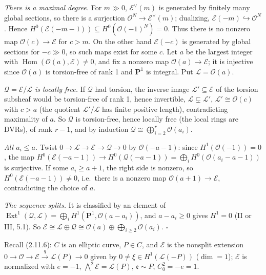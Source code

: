 \documentclass[11pt]{article}
\begin{document}
\emph{There is a maximal degree.} For $m\gg0$, $\mathcal E^\vee(m)$ is generated by finitely many global sections, so there is a surjection $\mathcal O^N\to\mathcal E^\vee(m)$; dualizing, $\mathcal E(-m)\hookrightarrow\mathcal O^N$. Hence $H^0(\mathcal E(-m-1))\subseteq H^0(\mathcal O(-1)^N)=0$. Thus there is no nonzero map $\mathcal O(c)\to\mathcal E$ for $c>m$. On the other hand $\mathcal E(-c)$ is generated by global sections for $-c\gg0$, so such maps exist for some $c$. Let $a$ be the largest integer with $\operatorname{Hom}(\mathcal O(a),\mathcal E)\ne0$, and fix a nonzero map $\mathcal O(a)\to\mathcal E$; it is injective since $\mathcal O(a)$ is torsion-free of rank 1 and $\mathbf P^1$ is integral. Put $\mathcal L=\mathcal O(a)$.

\emph{$\mathcal Q=\mathcal E/\mathcal L$ is locally free.} If $\mathcal Q$ had torsion, the inverse image $\mathcal L'\subseteq\mathcal E$ of the torsion subsheaf would be torsion-free of rank 1, hence invertible, $\mathcal L\subsetneq\mathcal L'$, $\mathcal L'\cong\mathcal O(c)$ with $c>a$ (the quotient $\mathcal L'/\mathcal L$ has finite positive length), contradicting maximality of $a$. So $\mathcal Q$ is torsion-free, hence locally free (the local rings are DVRs), of rank $r-1$, and by induction $\mathcal Q\cong\bigoplus_{i=2}^r\mathcal O(a_i)$.

\emph{All $a_i\le a$.} Twist $0\to\mathcal L\to\mathcal E\to\mathcal Q\to0$ by $\mathcal O(-a-1)$: since $H^1(\mathcal O(-1))=0$, the map $H^0(\mathcal E(-a-1))\to H^0(\mathcal Q(-a-1))=\bigoplus_iH^0(\mathcal O(a_i-a-1))$ is surjective. If some $a_i\ge a+1$, the right side is nonzero, so $H^0(\mathcal E(-a-1))\ne0$, i.e.\ there is a nonzero map $\mathcal O(a+1)\to\mathcal E$, contradicting the choice of $a$.

\emph{The sequence splits.} It is classified by an element of $\operatorname{Ext}^1(\mathcal Q,\mathcal L)=\bigoplus_iH^1(\mathbf P^1,\mathcal O(a-a_i))$, and $a-a_i\ge0$ gives $H^1=0$ (II or III, 5.1). So $\mathcal E\cong\mathcal L\oplus\mathcal Q\cong\mathcal O(a)\oplus\bigoplus_{i\ge2}\mathcal O(a_i)$. \hfill$\square$

\pf
Recall (2.11.6): $C$ is an elliptic curve, $P\in C$, and $\mathcal E$ is the nonsplit extension $0\to\mathcal O\to\mathcal E\xrightarrow{q}\mathcal L(P)\to0$ given by $0\ne\xi\in H^1(\mathcal L(-P))$ ($\dim=1$); $\mathcal E$ is normalized with $e=-1$, $\bigwedge^2\mathcal E=\mathcal L(P)$, $\mathfrak e\sim P$, $C_0^2=-e=1$.
\end{document}
